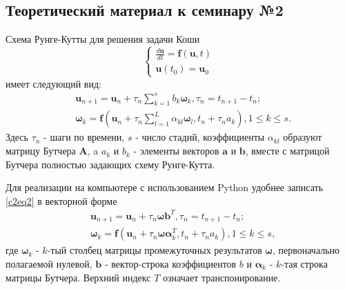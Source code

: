 \chapter{}

\section{Теоретический материал к семинару №2}

Схема Рунге-Кутты для решения задачи Коши
\begin{equation} \label{c2eq1}
	\begin{cases}
		\displaystyle \frac{d\mathbf{u}}{dt} = \mathbf{f} \left( \mathbf{u}, t \right) \\
		\mathbf{u}(t_0) = \mathbf{u}_0
	\end{cases}
\end{equation}
имеет следующий вид:
\begin{equation} \label{c2eq2}
	\begin{split}
		&\mathbf{u}_{n+1} = \mathbf{u}_n + \tau_n \sum_{k=1}^{s} b_k \boldsymbol{\omega}_k, \tau_n = t_{n+1} - t_n; \\
		&\boldsymbol{\omega}_k = \mathbf{f} \left( \mathbf{u}_n + \tau_n \sum_{l=1}^{L} \alpha_{kl} \boldsymbol{\omega}_l, t_n + \tau_n a_k \right), 1 \le k \le s.
	\end{split}
\end{equation}
Здесь $\tau_n$ - шаги по времени, $s$ - число стадий, коэффициенты $\alpha_{kl}$ образуют матрицу Бутчера $\mathbf{A}$, a $a_k$ и $b_k$ - элементы векторов $\mathbf{a}$ и $\mathbf{b}$, вместе с матрицой Бутчера полностью задающих схему Рунге-Кутта.

Для реализации на компьютере с использованием Python удобнее записать \eqref{c2eq2} в векторной форме
\begin{equation} \label{c2eq3}
	\begin{split}
		&\mathbf{u}_{n+1} = \mathbf{u}_n + \tau_n \boldsymbol{\omega} \mathbf{b}^T, \tau_n = t_{n+1} - t_n; \\
		&\boldsymbol{\omega}_k = \mathbf{f} \left( \mathbf{u}_n + \tau_n \boldsymbol{\omega} \boldsymbol{\alpha}^T_k, t_n + \tau_n a_k \right), 1 \le k \le s,
	\end{split} 
\end{equation}
где $\boldsymbol{\omega}_k$ - $k$-тый столбец матрицы промежуточных результатов $\boldsymbol{\omega}$, первоначально полагаемой нулевой, $\mathbf{b}$ - вектор-строка коэффициентов $b$ и $\boldsymbol{\alpha}_k$ - $k$-тая строка матрицы Бутчера. Верхний индекс $T$ означает транспонирование.

